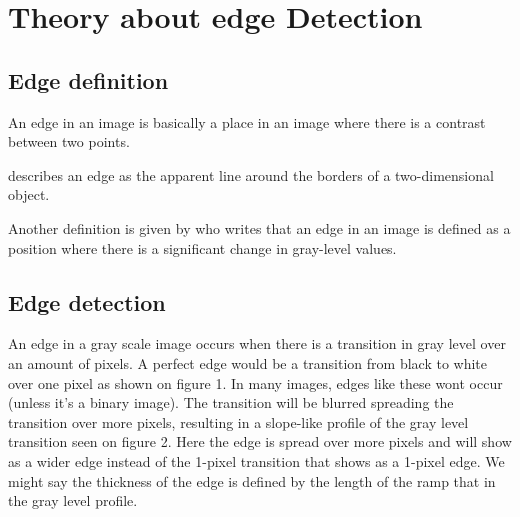 \chapter{Theory about edge Detection}
\section{Edge definition}
An edge in an image is basically a place in an image where there is a contrast between two points.

\citet{visual_story} describes an edge as the apparent line around the borders of a two-dimensional object.

Another definition is given by \citep{ip_book} who writes that an edge in an image is defined as a position where there is a significant change in gray-level values.

\section{Edge detection}
An edge in a gray scale image occurs when there is a transition in gray level over an 
amount of pixels. A perfect edge would be a transition from black to white over one pixel 
as shown on figure 1. In many images, edges like these wont occur (unless it’s a binary 
image). The transition will be blurred spreading the transition over more pixels, resulting 
in a slope-like profile of the gray level transition seen on figure 2. Here the edge is spread 
over more pixels and will show as a wider edge instead of the 1-pixel transition that 
shows as a 1-pixel edge. We might say the thickness of the edge is defined by the length 
of the ramp that in the gray level profile.